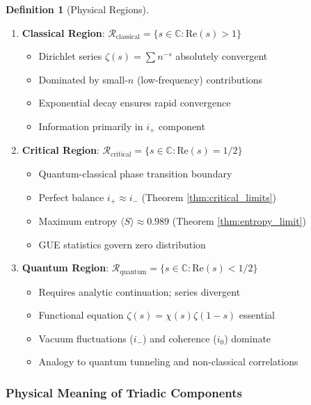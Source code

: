 \documentclass[12pt]{article}
\theoremstyle{plain}
\theoremstyle{definition}
\newtheorem{definition}[theorem]{Definition}
\begin{document}
\begin{definition}[Physical Regions]\label{def:physical_regions}
\begin{enumerate}
\item \textbf{Classical Region}: $\mathcal{R}_{\text{classical}} = \{s \in \mathbb{C} : \text{Re}(s) > 1\}$
   \begin{itemize}
   \item Dirichlet series $\zeta(s) = \sum n^{-s}$ absolutely convergent
   \item Dominated by small-$n$ (low-frequency) contributions
   \item Exponential decay ensures rapid convergence
   \item Information primarily in $i_+$ component
   \end{itemize}

\item \textbf{Critical Region}: $\mathcal{R}_{\text{critical}} = \{s \in \mathbb{C} : \text{Re}(s) = 1/2\}$
   \begin{itemize}
   \item Quantum-classical phase transition boundary
   \item Perfect balance $i_+ \approx i_-$ (Theorem \ref{thm:critical_limits})
   \item Maximum entropy $\langle S \rangle \approx 0.989$ (Theorem \ref{thm:entropy_limit})
   \item GUE statistics govern zero distribution \cite{montgomery1973,keating2000}
   \end{itemize}

\item \textbf{Quantum Region}: $\mathcal{R}_{\text{quantum}} = \{s \in \mathbb{C} : \text{Re}(s) < 1/2\}$
   \begin{itemize}
   \item Requires analytic continuation; series divergent
   \item Functional equation $\zeta(s) = \chi(s)\zeta(1-s)$ essential
   \item Vacuum fluctuations ($i_-$) and coherence ($i_0$) dominate
   \item Analogy to quantum tunneling and non-classical correlations
   \end{itemize}
\end{enumerate}
\end{definition}

\subsubsection{Physical Meaning of Triadic Components}
\end{document}
